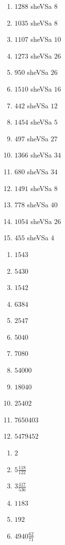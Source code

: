 \begin{multicols}{3}
\begin{enumerate}[$(1)$]
\item $1288$ sheVSa $8$
\item $1035$ sheVSa $8$
\item $1107$ sheVSa $10$ 
\item $1273$ sheVSa $26$ 
\item $950$ sheVSa $26$ 
\item $1510$ sheVSa $16$
\item $442$ sheVSa $12$ 
\item $1454$ sheVSa $5$  
\item $497$ sheVSa $27$  
\item $1366$ sheVSa $34$ 
\item $680$ sheVSa $34$ 
\item $1491$ sheVSa $8$ 
\item $778$ sheVSa $40$ 
\item $1054$ sheVSa $26$ 
\item $455$ sheVSa $4$ 
\end{enumerate}
\end{multicols}


\begin{multicols}{3}
\begin{enumerate}[$(1)$]
\item $1543$ 
\item $5430$ 
\item $1542$ 
\item $6384$  
\item $2547$ 
\item $5040$ 
\item $7080$ 
\item $54000$  
\item $18040$ 
\item $25402$ 
\item $7650403$ 
\item $5479452$
\end{enumerate}
\end{multicols}


\begin{multicols}{6}
\begin{enumerate}[$(1)$]
\item $2$ 
\item $5\frac{118}{122}$
\item $3 \frac{417}{536}$ 
\item $1183$   
\item $192$ 
\item $4940 \frac{62}{71}$
\end{enumerate}
\end{multicols}

